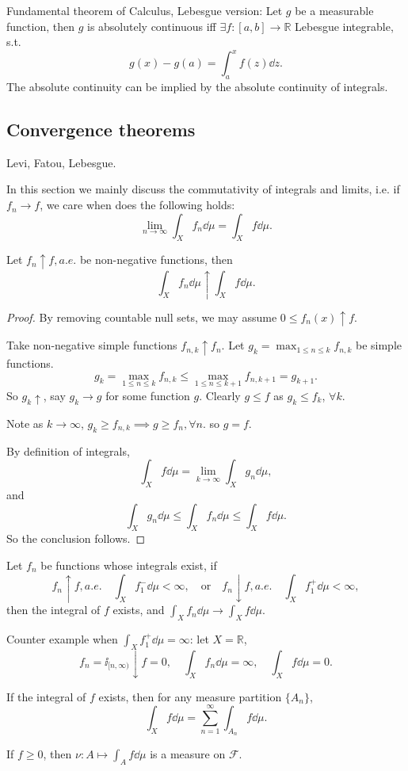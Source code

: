 \begin{example}
    Fundamental theorem of Calculus, Lebesgue version:
	Let $g$ be a measurable function, then $g$ is absolutely continuous
	iff $\exists f: [a,b]\to \mathbb{R}$ Lebesgue integrable, s.t.
	\[
	g(x) - g(a) = \int_a^x f(z)\dd z.
	\]
	The absolute continuity can be implied by the absolute continuity of
	integrals.
\end{example}

\subsection{Convergence theorems}
\label{sub:Convergence theorems}

Levi, Fatou, Lebesgue.

In this section we mainly discuss the commutativity of
integrals and limits, i.e. if $f_n \to f$, we care when does the following holds:
\[
\lim_{n\to \infty} \int_X f_n \dd \mu = \int_X f\dd \mu.
\]

\begin{theorem}
    Let $f_n \uparrow f, a.e.$ be non-negative functions, then
	\[
	\int_X f_n \dd \mu \uparrow \int_X f\dd \mu.
	\]
\end{theorem}
\begin{proof}[Proof]
    By removing countable null sets, we may assume $0 \le f_n(x)\uparrow f$.

	Take non-negative simple functions $f_{n,k}\uparrow f_n$.
	Let $g_k = \max_{1\le n\le k}f_{n, k}$ be simple functions.
	\[
	g_k = \max_{1\le n\le k}f_{n, k}\le \max_{1\le n\le k+1} f_{n, k+1} = g_{k+1}.
	\]
	So $g_k \uparrow$, say $g_k \to g$ for some function $g$.
	Clearly $g\le f$ as $g_k \le f_k$, $\forall k$.

	Note as $k\to \infty$, $g_k \ge f_{n,k}\implies g\ge f_n, \forall n$.
	so $g = f$.

	By definition of integrals,
	\[
	\int_X f\dd \mu = \lim_{k\to \infty} \int_X g_n\dd \mu,
	\]
	and
	\[
	\int_X g_n \dd \mu \le \int_X f_n\dd \mu \le \int_X f\dd \mu.
	\]
	So the conclusion follows.
\end{proof}
\begin{corollary}
    Let $f_n$ be functions whose integrals exist, if
	\[
	f_n \uparrow f, a.e. \quad \int_X f_1^- \dd \mu < \infty,\quad
	\text{or}\quad
	f_n \downarrow f, a.e. \quad \int_X f_1^+ \dd \mu < \infty,
	\]
	then the integral of $f$ exists, and $\int_X f_n \dd \mu \to \int_X f\dd \mu$.
\end{corollary}
\begin{remark}
    Counter example when $\int_X f_1^+ \dd \mu = \infty$: let $X = \mathbb{R}$,
	\[
		f_n = \ii_{[n, \infty)} \downarrow f = 0,\quad
		\int_X f_n \dd \mu = \infty, \quad \int_X f \dd \mu = 0.
	\]
\end{remark}

\begin{corollary}
    If the integral of $f$ exists, then for any measure partition $\{A_n\}$,
	\[
	\int_X f\dd \mu = \sum_{n=1}^{\infty} \int_{A_n}f\dd \mu.
	\]
\end{corollary}

If $f\ge 0$, then $\nu: A\mapsto \int_A f\dd \mu$ is a measure on $\mathscr{F}$.
